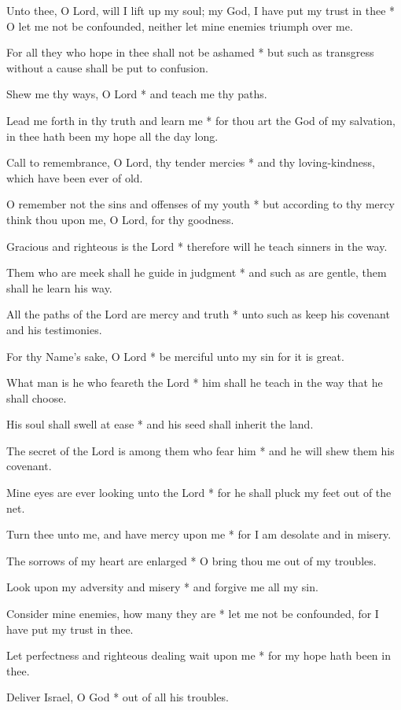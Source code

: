 Unto thee, O Lord, will I lift up my soul; my God, I have put my trust in thee * O let me not be confounded, neither let mine enemies triumph over me.

For all they who hope in thee shall not be ashamed * but such as transgress without a cause shall be put to confusion.

Shew me thy ways, O Lord * and teach me thy paths.

Lead me forth in thy truth and learn me * for thou art the God of my salvation, in thee hath been my hope all the day long.

Call to remembrance, O Lord, thy tender mercies * and thy loving-kindness, which have been ever of old.

O remember not the sins and offenses of my youth * but according to thy mercy think thou upon me, O Lord, for thy goodness.

Gracious and righteous is the Lord * therefore will he teach sinners in the way.

Them who are meek shall he guide in judgment * and such as are gentle, them shall he learn his way.

All the paths of the Lord are mercy and truth * unto such as keep his covenant and his testimonies.

For thy Name's sake, O Lord * be merciful unto my sin for it is great.

What man is he who feareth the Lord * him shall he teach in the way that he shall choose.

His soul shall swell at ease * and his seed shall inherit the land.

The secret of the Lord is among them who fear him * and he will shew them his covenant.

Mine eyes are ever looking unto the Lord * for he shall pluck my feet out of the net.

Turn thee unto me, and have mercy upon me * for I am desolate and in misery.

The sorrows of my heart are enlarged * O bring thou me out of my troubles.

Look upon my adversity and misery * and forgive me all my sin.

Consider mine enemies, how many they are * let me not be confounded, for I have put my trust in thee.

Let perfectness and righteous dealing wait upon me * for my hope hath been in thee.

Deliver Israel, O God * out of all his troubles.